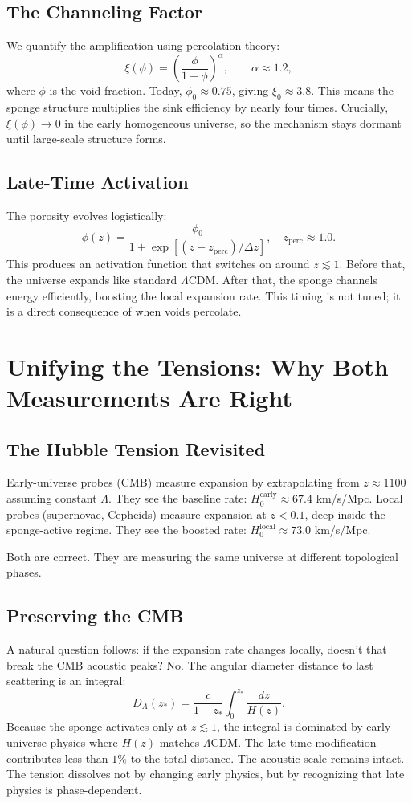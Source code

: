 \documentclass[12pt,a4paper]{report}
\begin{document}
\section{The Channeling Factor}
We quantify the amplification using percolation theory:
$$
\xi(\phi) = \left(\frac{\phi}{1-\phi}\right)^\alpha, \qquad \alpha \approx 1.2,
$$
where $\phi$ is the void fraction. Today, $\phi_0 \approx 0.75$, giving $\xi_0 \approx 3.8$. This means the sponge structure multiplies the sink efficiency by nearly four times. Crucially, $\xi(\phi) \to 0$ in the early homogeneous universe, so the mechanism stays dormant until large-scale structure forms.

\section{Late-Time Activation}
The porosity evolves logistically:
$$
\phi(z) = \frac{\phi_0}{1 + \exp[(z - z_{\text{perc}})/\Delta z]}, \quad z_{\text{perc}} \approx 1.0.
$$
This produces an activation function that switches on around $z \lesssim 1$. Before that, the universe expands like standard $\Lambda$CDM. After that, the sponge channels energy efficiently, boosting the local expansion rate. This timing is not tuned; it is a direct consequence of when voids percolate.

\chapter{Unifying the Tensions: Why Both Measurements Are Right}
\section{The Hubble Tension Revisited}
Early-universe probes (CMB) measure expansion by extrapolating from $z \approx 1100$ assuming constant $\Lambda$. They see the baseline rate: $H_0^{\text{early}} \approx 67.4$ km/s/Mpc. Local probes (supernovae, Cepheids) measure expansion at $z < 0.1$, deep inside the sponge-active regime. They see the boosted rate: $H_0^{\text{local}} \approx 73.0$ km/s/Mpc.

Both are correct. They are measuring the same universe at different topological phases.

\section{Preserving the CMB}
A natural question follows: if the expansion rate changes locally, doesn't that break the CMB acoustic peaks? No. The angular diameter distance to last scattering is an integral:
$$
D_A(z_*) = \frac{c}{1+z_*} \int_0^{z_*} \frac{dz}{H(z)}.
$$
Because the sponge activates only at $z \lesssim 1$, the integral is dominated by early-universe physics where $H(z)$ matches $\Lambda$CDM. The late-time modification contributes less than $1\%$ to the total distance. The acoustic scale remains intact. The tension dissolves not by changing early physics, but by recognizing that late physics is phase-dependent.
\end{document}
